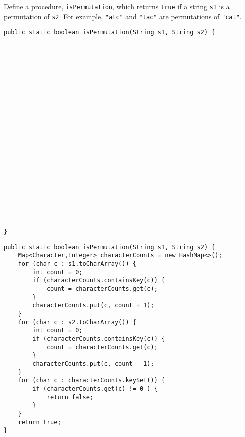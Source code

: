 \begin{blocksection}
\question Define a procedure, \lstinline$isPermutation$, which returns
\lstinline$true$ if a string \lstinline$s1$ is a permutation of \lstinline$s2$.
For example, \lstinline$"atc"$ and \lstinline$"tac"$ are permutations of
\lstinline$"cat"$.

\ifprintanswers\else
\begin{lstlisting}
public static boolean isPermutation(String s1, String s2) {























}
\end{lstlisting}
\fi

\begin{solution}
\begin{lstlisting}
public static boolean isPermutation(String s1, String s2) {
    Map<Character,Integer> characterCounts = new HashMap<>();
    for (char c : s1.toCharArray()) {
        int count = 0;
        if (characterCounts.containsKey(c)) {
            count = characterCounts.get(c);
        }
        characterCounts.put(c, count + 1);
    }
    for (char c : s2.toCharArray()) {
        int count = 0;
        if (characterCounts.containsKey(c)) {
            count = characterCounts.get(c);
        }
        characterCounts.put(c, count - 1);
    }
    for (char c : characterCounts.keySet()) {
        if (characterCounts.get(c) != 0 ) {
            return false;
        }
    }
    return true;
}
\end{lstlisting}
\end{solution}
\end{blocksection}
